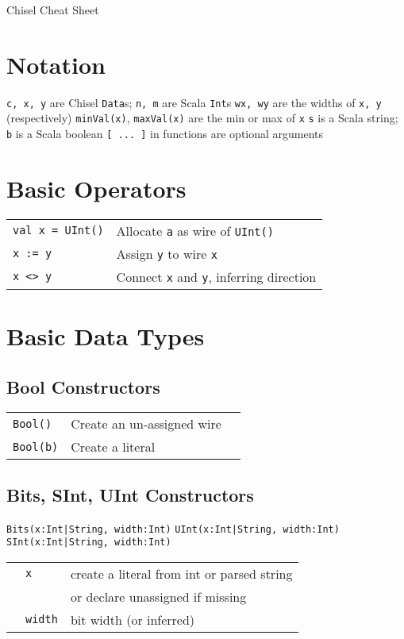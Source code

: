 \documentclass[10pt,landscape]{article}
\begin{document}
\begin{multicols}{3}

\begin{center}
\Large{Chisel Cheat Sheet}
\end{center}

\renewcommand{\tabcolsep}{.5mm}

\section{Notation}
\verb$c, x, y$ are Chisel \verb$Data$s; \verb$n, m$ are Scala \verb$Int$s \newline
\verb$wx, wy$ are the widths of \verb$x, y$ (respectively) \newline
\verb$minVal(x)$, \verb$maxVal(x)$ are the min or max of \verb$x$ \newline
\verb$s$ is a Scala string; \verb$b$ is a Scala boolean \newline
\verb$[ ... ]$ in functions are optional arguments

\section{Basic Operators}
\begin{tabular}{l l}
\verb$val x = UInt()$ & Allocate \verb$a$ as wire of \verb$UInt()$ \\
\verb$x := y$ & Assign \verb$y$ to wire \verb$x$ \\
\verb$x <> y$ & Connect \verb$x$ and \verb$y$, inferring direction \\
\end{tabular}

\section{Basic Data Types}
\subsection{Bool Constructors}
\begin{tabular}{l l l}
\verb$Bool()$ & Create an un-assigned wire \\
\verb$Bool(b)$ & Create a literal \\
\end{tabular}

\subsection{Bits, SInt, UInt Constructors}
\verb$Bits(x:Int|String, width:Int)$ \newline
\verb$UInt(x:Int|String, width:Int)$ \newline
\verb$SInt(x:Int|String, width:Int)$ \newline
\begin{tabular}{l l l}
& \verb$x$ & create a literal from int or parsed string \\
& & or declare unassigned if missing \\
& \verb$width$ & bit width (or inferred) \\
\end{tabular}


\end{multicols}
\end{document}
